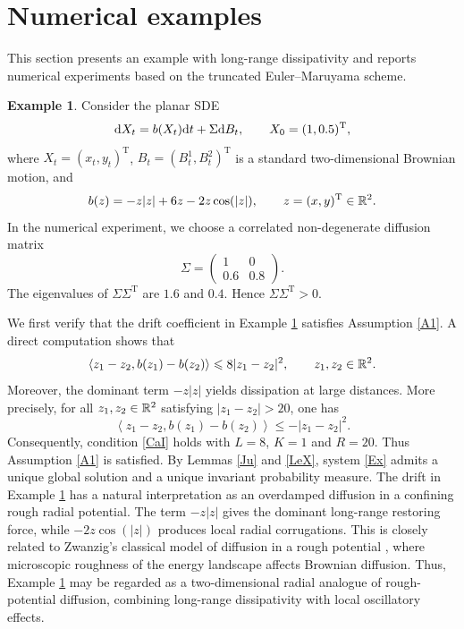 \documentclass[aap]{imsart}
\theoremstyle{plain}
\theoremstyle{definition}
\newtheorem{example}{Example}
\begin{document}
			\section{Numerical examples}
			This section presents an example with long-range dissipativity and reports numerical experiments based on the truncated Euler--Maruyama scheme.
			\begin{example}\label{EX}
				Consider the planar SDE
				\begin{equation}\label{Ex}
					\mathrm{d} X_t = b(X_t)\mathrm{d} t+\Sigma\mathrm{d} B_t,\qquad 
					X_0=(1,0.5)^{\mathrm T},
				\end{equation}
				where $X_t=(x_t,y_t)^{\mathrm T}$, $B_t=(B_t^1,B_t^2)^{\mathrm T}$ is a standard two-dimensional Brownian motion, and
				\[b(z)=-z|z|+6z-2z\cos(|z|),\qquad z=(x,y)^{\mathrm T}\in\mathbb{R}^2.\]
				In the numerical experiment, we choose a correlated non-degenerate diffusion matrix
				\[
				\Sigma=
				\begin{pmatrix}
					1&0\\
					0.6&0.8
				\end{pmatrix}.
				\]
				The eigenvalues of \(\Sigma\Sigma^{\mathrm T}\) are $1.6$ and $0.4$. Hence $\Sigma\Sigma^{\mathrm T}>0$.
			\end{example}
			We first verify that the drift coefficient in Example \ref{EX} satisfies Assumption \ref{A1}.	
			A direct computation shows that
			\[
			\left\langle z_1-z_2,b(z_1)-b(z_2)\right\rangle
			\leqslant 8|z_1-z_2|^2,\qquad z_1,z_2\in\mathbb{R}^2.
			\]
			Moreover, the dominant term \(-z|z|\) yields dissipation at large distances. More precisely, for all \(z_1,z_2\in\mathbb{R}^2\) satisfying \(|z_1-z_2|>20\), one has
			\[
			\left\langle z_1-z_2,b(z_1)-b(z_2)\right\rangle
			\leqslant -|z_1-z_2|^2 .
			\]
			Consequently, condition \eqref{CaI} holds with \(L=8\), \(K=1\) and \(R=20\). Thus Assumption \ref{A1} is satisfied. By Lemmas \ref{Ju} and \ref{LeX}, system \eqref{Ex} admits a unique global solution and a unique invariant probability measure. The drift in Example \ref{EX} has a natural interpretation as an overdamped diffusion in a confining rough radial potential. The term \(-z|z|\) gives the dominant long-range restoring force, while \(-2z\cos(|z|)\) produces local radial corrugations. This is closely related to Zwanzig's classical model of diffusion in a rough potential \cite{Zwanzig}, where microscopic roughness of the energy landscape affects Brownian diffusion. Thus, Example \ref{EX} may be regarded as a two-dimensional radial analogue of rough-potential diffusion, combining long-range dissipativity with local oscillatory effects.
			
\end{document}
